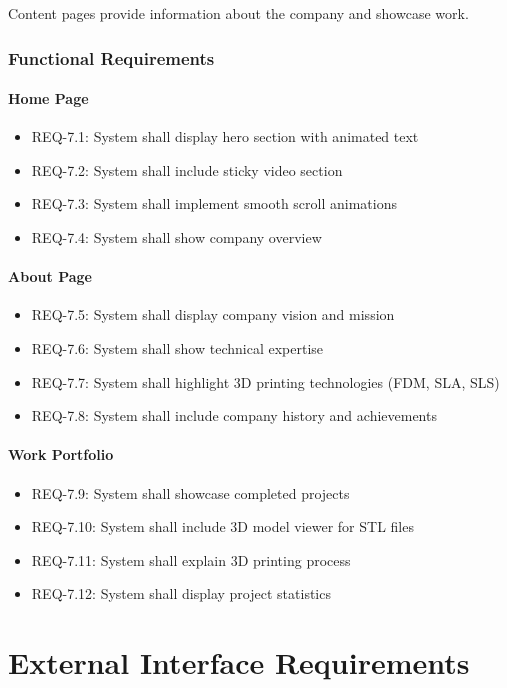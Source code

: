 \documentclass{scrreprt}
\begin{document}
Content pages provide information about the company and showcase work.

\subsection{Functional Requirements}

\subsubsection{Home Page}
\begin{itemize}
\item REQ-7.1: System shall display hero section with animated text
\item REQ-7.2: System shall include sticky video section
\item REQ-7.3: System shall implement smooth scroll animations
\item REQ-7.4: System shall show company overview
\end{itemize}

\subsubsection{About Page}
\begin{itemize}
\item REQ-7.5: System shall display company vision and mission
\item REQ-7.6: System shall show technical expertise
\item REQ-7.7: System shall highlight 3D printing technologies (FDM, SLA, SLS)
\item REQ-7.8: System shall include company history and achievements
\end{itemize}

\subsubsection{Work Portfolio}
\begin{itemize}
\item REQ-7.9: System shall showcase completed projects
\item REQ-7.10: System shall include 3D model viewer for STL files
\item REQ-7.11: System shall explain 3D printing process
\item REQ-7.12: System shall display project statistics
\end{itemize}

\chapter{External Interface Requirements}
\end{document}
